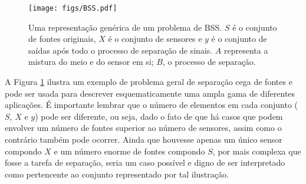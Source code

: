 \begin{figure}[H]
    \centering
    \texttt{[image: figs/BSS.pdf]}
    \caption{Uma representação genérica de um problema de BSS. $S$ é o conjunto de fontes originais, $X$ é o conjunto de sensores e $y$ é o conjunto de saídas após todo o processo de separação de sinais. $A$ representa a mistura do meio e do sensor em si; $B$, o processo de separação.}
    \label{fig:bss}
\end{figure}

A Figura \ref{fig:bss} ilustra um exemplo de problema geral de separação cega de fontes e pode ser usada para descrever esquematicamente uma ampla gama de diferentes aplicações. É importante lembrar que o número de elementos em cada conjunto ($S$, $X$ e $y$) pode ser diferente, ou seja, dado o fato de que há casos que podem envolver um número de fontes superior ao número de sensores, assim como o contrário também pode ocorrer. Ainda que houvesse apenas um único sensor compondo $X$ e um número enorme de fontes compondo $S$, por mais complexa que fosse a tarefa de separação, seria um caso possível e digno de ser interpretado como pertencente ao conjunto representado por tal ilustração.





